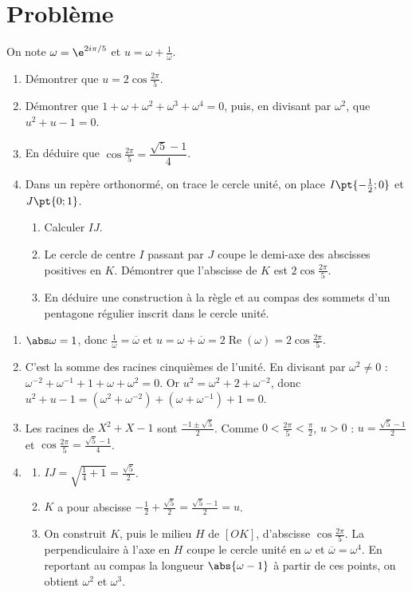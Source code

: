 \section{Problème}
\begin{problem}
On note $\omega=\e^{2i\pi/5}$ et $u=\omega+\frac1\omega$.
\begin{enumerate}
\item Démontrer que $u=2\cos\frac{2\pi}5$.
\item Démontrer que $1+\omega+\omega^2+\omega^3+\omega^4=0$, puis, en divisant par $\omega^2$, que $u^2+u-1=0$.
\item En déduire que $\cos\frac{2\pi}5=\dfrac{\sqrt5-1}4$.
\item Dans un repère orthonormé, on trace le cercle unité, on place $I\pt{-\frac12;0}$ et $J\pt{0;1}$.
\begin{enumerate}
\item Calculer $IJ$.
\item Le cercle de centre $I$ passant par $J$ coupe le demi-axe des abscisses positives en $K$. Démontrer que l'abscisse de $K$ est $2\cos\frac{2\pi}5$.
\item En déduire une construction à la règle et au compas des sommets d'un pentagone régulier inscrit dans le cercle unité.
\end{enumerate}
\end{enumerate}
\end{problem}
\begin{solution}[Problème]
\begin{enumerate}
\item $\abs\omega=1$, donc $\frac1\omega=\overline\omega$ et $u=\omega+\overline\omega=2\operatorname{Re}(\omega)=2\cos\frac{2\pi}5$.
\item C'est la somme des racines cinquièmes de l'unité. En divisant par $\omega^2\neq0$ : $\omega^{-2}+\omega^{-1}+1+\omega+\omega^2=0$. Or $u^2=\omega^2+2+\omega^{-2}$, donc $u^2+u-1=\left(\omega^2+\omega^{-2}\right)+\left(\omega+\omega^{-1}\right)+1=0$.
\item Les racines de $X^2+X-1$ sont $\frac{-1\pm\sqrt5}2$. Comme $0<\frac{2\pi}5<\frac\pi2$, $u>0$ : $u=\frac{\sqrt5-1}2$ et $\cos\frac{2\pi}5=\frac{\sqrt5-1}4$.
\item
\begin{enumerate}
\item $IJ=\sqrt{\frac14+1}=\frac{\sqrt5}2$.
\item $K$ a pour abscisse $-\frac12+\frac{\sqrt5}2=\frac{\sqrt5-1}2=u$.
\item On construit $K$, puis le milieu $H$ de $[OK]$, d'abscisse $\cos\frac{2\pi}5$. La perpendiculaire à l'axe en $H$ coupe le cercle unité en $\omega$ et $\overline\omega=\omega^4$. En reportant au compas la longueur $\abs{\omega-1}$ à partir de ces points, on obtient $\omega^2$ et $\omega^3$.
\end{enumerate}
\end{enumerate}
\end{solution}
